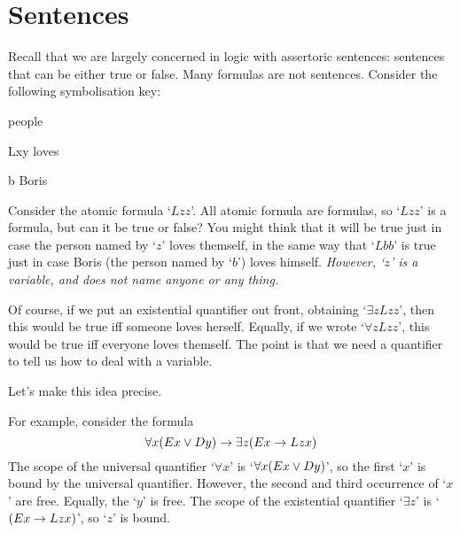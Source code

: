 

\section{Sentences}
Recall that we are largely concerned in logic with assertoric sentences: sentences that can be either true or false. Many formulas are not sentences. Consider the following symbolisation key:
	\begin{ekey}
		\item[\text{domain}] people
		\item[Lxy]  loves 
		\item[b] Boris
	\end{ekey}
Consider the atomic formula `$Lzz$'. All atomic formula are formulas, so `$Lzz$' is a formula, but can it be true or false? You might think that it will be true just in case the person named by `$z$' loves themself, in the same way that `$Lbb$' is true just in case Boris (the person named by `$b$') loves himself. \emph{However, `$z$' is a variable, and does not name anyone or any thing.}

Of course, if we put an existential quantifier out front, obtaining `$\exists zLzz$', then this would be true iff someone loves herself. Equally, if we wrote `$\forall z Lzz$', this would be true iff everyone loves themself. The point is that we need a quantifier to tell us how to deal with a variable. 

Let's make this idea precise.



        
For example, consider the formula
	$$\forall x(Ex \vee Dy) \rightarrow \exists z(Ex \rightarrow Lzx)$$
The scope of the universal quantifier `$\forall x$' is `$\forall x (Ex \vee Dy)$', so the first `$x$' is bound by the universal quantifier. However, the second and third occurrence of `$x$' are free. Equally, the `$y$' is free. The scope of the existential quantifier `$\exists z$' is `$(Ex \rightarrow Lzx)$', so `$z$' is bound. 

